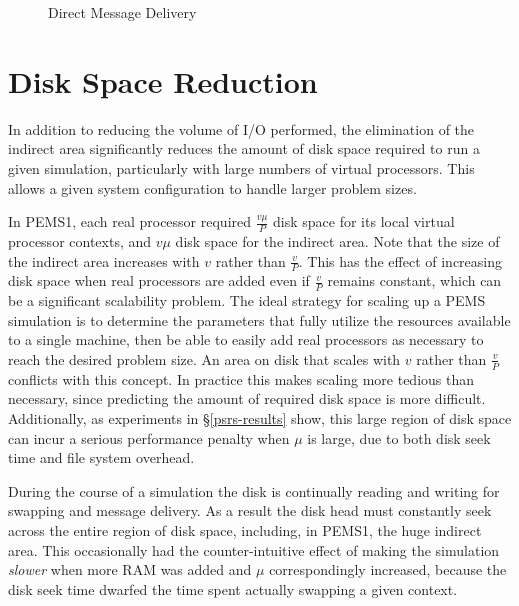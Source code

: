 \documentclass[12pt]{carletoncsthesis}
\begin{document}
\begin{figure}[ht]
\begin{center}
\caption{Direct Message Delivery}
\label{message-direct}
\end{center}
\end{figure}

\section{Disk Space Reduction}
\label{s-disk-space}


In addition to reducing the volume of I/O performed, the elimination of the
indirect area significantly reduces the amount of disk space required to run
a given simulation, particularly with large numbers of virtual processors.
This allows a given system configuration to handle larger problem sizes.

In PEMS1, each real processor required $\frac{v\mu}{P}$ disk space for its
local virtual processor contexts, and $v\mu$ disk space for the indirect
area.  Note that the size of the indirect area increases with $v$ rather
than $\frac{v}{P}$.  This has the effect of increasing disk space when real
processors are added even if $\frac{v}{P}$ remains constant, which can be a
significant scalability problem.  The ideal strategy for scaling up a PEMS
simulation is to determine the parameters that fully utilize the resources
available to a single machine, then be able to easily add real processors
as necessary to reach the desired problem size.  An area on disk that scales
with $v$ rather than $\frac{v}{P}$ conflicts with this concept.  In practice
this makes scaling more tedious than necessary, since predicting the amount
of required disk space is more difficult.  Additionally, as experiments
in \S\ref{psrs-results} show, this large region of disk space can incur a
serious performance penalty when $\mu$ is large, due to both disk seek time
and file system overhead.

During the course of a simulation the disk is continually reading and writing
for swapping and message delivery.  As a result the disk head must constantly
seek across the entire region of disk space, including, in PEMS1, the huge
indirect area.  This occasionally had the counter-intuitive effect of making
the simulation {\em slower} when more RAM was added and $\mu$ correspondingly
increased, because the disk seek time dwarfed the time spent actually swapping
a given context.
\end{document}
